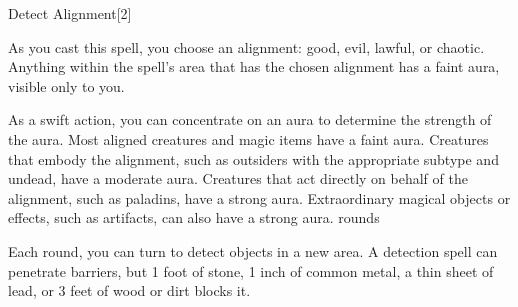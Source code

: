 \begin{spellsection}{Detect Alignment}[2]
    \begin{spellheader}
    \end{spellheader}
    \begin{spellcontent}
        \begin{spelltargetinginfo}
        \end{spelltargetinginfo}
        \begin{spelleffects}
            \spelleffect As you cast this spell, you choose an alignment: good, evil, lawful, or chaotic. Anything within the spell's area that has the chosen alignment has a faint aura, visible only to you.

            As a swift action, you can concentrate on an aura to determine the strength of the aura. Most aligned creatures and magic items have a faint aura. Creatures that embody the alignment, such as outsiders with the appropriate subtype and undead,  have a moderate aura. Creatures that act directly on behalf of the alignment, such as paladins, have a strong aura. Extraordinary magical objects or effects, such as artifacts, can also have a strong aura.
             rounds
        \end{spelleffects}
    \end{spellcontent}
    \begin{spellfooter}
        \spellnotes Each round, you can turn to detect objects in a new area. A detection spell can penetrate barriers, but 1 foot of stone, 1 inch of common metal, a thin sheet of lead, or 3 feet of wood or dirt blocks it.
        \miscastexplode
    \end{spellfooter}
\end{spellsection}


